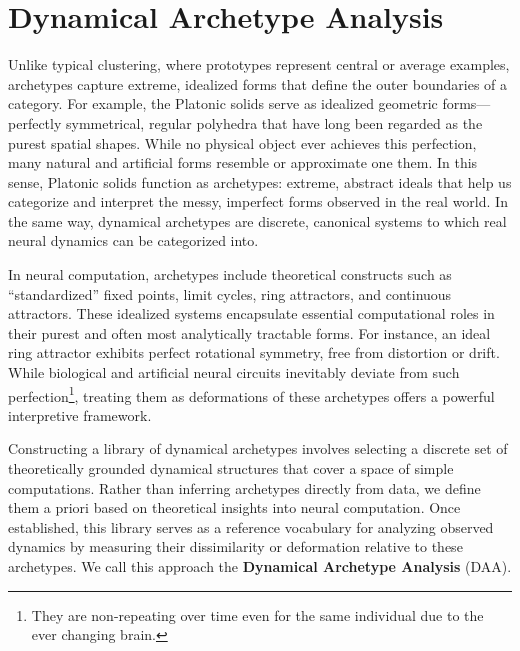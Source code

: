 \documentclass{article}
\theoremstyle{definition} \newtheorem{definition}{Definition}  \newtheorem{example}{Example}
\theoremstyle{remark} \newtheorem{remark}{Remark}
\newcounter{ct}
\begin{document}
\section{Dynamical Archetype Analysis}\label{sec:dmm}\label{sec:daa}
Unlike typical clustering, where prototypes represent central or average examples, archetypes capture extreme, idealized forms that define the outer boundaries of a category. For example, the Platonic solids serve as idealized geometric forms---perfectly symmetrical, regular polyhedra that have long been regarded as the purest spatial shapes. While no physical object ever achieves this perfection, many natural and artificial forms resemble or approximate one them.
In this sense, Platonic solids function as archetypes: extreme, abstract ideals that help us categorize and interpret the messy, imperfect forms observed in the real world.  In the same way, dynamical archetypes are discrete, canonical systems to which real neural dynamics can be categorized into.

In neural computation, archetypes include theoretical constructs such as ``standardized'' fixed points, limit cycles, ring attractors, and continuous attractors\citep{sussillo2013blackbox, katz2017fibers, golub2018fixedpointfinder,townley2000existence, pals2024inferring}. These idealized systems encapsulate essential computational roles in their purest and often most analytically tractable forms. For instance, an ideal ring attractor exhibits perfect rotational symmetry, free from distortion or drift. While biological and artificial neural circuits inevitably deviate from such perfection\footnote{They are non-repeating over time even for the same individual due to the ever changing brain\citep{chirimuuta2024brain}.}\citep{panichello2019error}, treating them as deformations of these archetypes offers a powerful interpretive framework.

Constructing a library of dynamical archetypes involves selecting a discrete set of theoretically grounded dynamical structures that cover a space of simple computations.
Rather than inferring archetypes directly from data, we define them a priori based on theoretical insights into neural computation.
Once established, this library serves as a reference vocabulary for analyzing observed dynamics by measuring their dissimilarity or deformation relative to these archetypes.
We call this approach the \textbf{Dynamical Archetype Analysis} (DAA).
\end{document}
